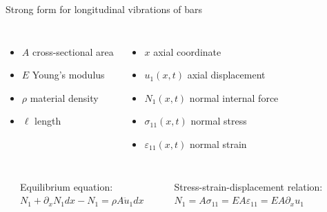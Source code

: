 \documentclass[aspectratio=169]{beamer}
\begin{document}
\begin{frame}{Strong form for longitudinal vibrations of bars}
\begin{columns}
    {\tiny \begin{itemize}\setlength\itemsep{0.05em}
        \item $A$ cross-sectional area
        \item $E$ Young's modulus
        \item $\rho$ material density
        \item $\ell$ length
      \end{itemize}}
    {\tiny \begin{itemize}\setlength\itemsep{0.05em}
        \item $x$ axial coordinate
        \item $u_1(x,t)$ axial displacement
        \item $N_1(x,t)$ normal internal force
        \item $\sigma_{11}(x,t)$ normal stress
        \item $\varepsilon_{11}(x,t)$ normal strain
      \end{itemize}}
  \end{columns}\vspace{-.3cm}
  \begin{columns}
    \begin{block}{}
    \end{block}
    \begin{block}{}
      \footnotesize\centering Equilibrium equation: \newline\newline $N_{1}+\partial_{x}N_1dx-N_{1}=\rho A\ddot{u}_{1}dx$
    \end{block}
    \begin{block}{}
      \footnotesize\centering Stress-strain-displacement relation: \newline\newline $N_1=A\sigma_{11}=EA\varepsilon_{11}=EA \partial_{x} u_1$
    \end{block}
  \end{columns}
\end{frame}
\end{document}
